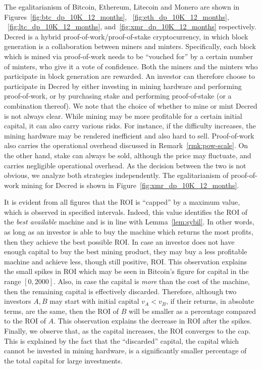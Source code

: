 The egalitarianism of Bitcoin, Ethereum, Litecoin and Monero are shown in
Figures~\ref{fig:btc_dp_10K_12_months}, ~\ref{fig:eth_dp_10K_12_months},
~\ref{fig:ltc_dp_10K_12_months}, and~\ref{fig:xmr_dp_10K_12_months}
respectively.
Decred is a hybrid proof-of-work/proof-of-stake cryptocurrency, in
which block generation is a collaboration between miners and minters.
Specifically, each block which is mined via proof-of-work needs to be
``vouched for'' by a certain number of minters, who give it a vote of
confidence. Both the miners and the minters who participate in block
generation are rewarded. An investor can therefore choose to participate in
Decred by either investing in mining hardware and performing proof-of-work, or
by purchasing stake and performing proof-of-stake (or a combination thereof).
We note that the choice of whether to mine or mint Decred is not always clear.
While mining may be more profitable for a certain initial capital, it can also
carry various risks. For instance, if the difficulty increases, the mining
hardware may be rendered inefficient and also hard to sell. Proof-of-work also
carries the operational overhead discussed in Remark~\ref{rmk:pow-scale}. On
the other hand, stake can always be sold, although the price may fluctuate, and
carries negligible operational overhead. As the decision between the two is not
obvious, we analyze both strategies independently. The egalitarianism of
proof-of-work mining for Decred is shown in
Figure~\ref{fig:xmr_dp_10K_12_months}.

It is evident from all figures that the ROI is ``capped'' by a maximum value,
which is observed in specified intervals. Indeed, this value identifies the
ROI of the \emph{best available} machine and is in line with Lemma~\ref{lem:sybil}. In other words, as long as an
investor is able to buy the machine which returns the most profits, then they
achieve the best possible ROI. In case an investor does not have enough capital
to buy the best mining product, they may buy a less profitable machine and
achieve less, though still positive, ROI. This observation explains the small
spikes in ROI which may be seen \eg in Bitcoin's figure for capital in the
range $[0, 2000]$. Also, in case the capital is \emph{more} than the cost of
the machine, then the remaining capital is effectively discarded. Therefore,
although two investors $A, B$ may start with initial capital $v_A < v_B$, if
their returns, in absolute terms, are the same, then the ROI
of $B$ will be smaller as a percentage compared to the ROI of $A$. This
observation explains the decrease in ROI after the spikes. Finally, we observe
that, as the capital increases, the ROI converges to the cap. This is
explained by the fact that the ``discarded'' capital, \ie the capital which
cannot be invested in mining hardware, is a significantly smaller percentage of
the total capital for large investments.


